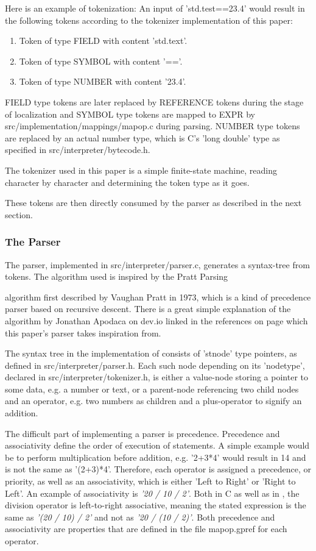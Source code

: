 \documentclass[12pt,a4paper]{report}
\newcommand{\cte}[1] {
    \cite{#1}
}
\begin{document}
Here is an example of tokenization:
An input of 'std.test==23.4' would result in the following tokens according
to the tokenizer implementation of this paper:
\begin{enumerate}
    \item Token of type FIELD with content 'std.text'.
    \item Token of type SYMBOL with content '=='.
    \item Token of type NUMBER with content '23.4'.
\end{enumerate}
FIELD type tokens are later replaced by REFERENCE tokens during the stage of localization
and SYMBOL type tokens are mapped to EXPR by src/implementation/mappings/mapop.c
during parsing. NUMBER type tokens are replaced by an actual number type, which
is C's 'long double' type as specified in src/interpreter/bytecode.h.

The tokenizer used in this paper is a simple finite-state machine, reading
character by character and determining the token type as it goes.

These tokens are then directly consumed by the parser as described in the next
section.

\subsubsection{The Parser}
The parser, implemented in src/interpreter/parser.c, generates a syntax-tree
from tokens. The algorithm used is inspired by the Pratt Parsing\cte{pratt}
algorithm first described by Vaughan Pratt in 1973, which is a kind of precedence
parser based on recursive descent. There is a great simple explanation of the algorithm
by Jonathan Apodaca on dev.io\cte{devio} linked in the references on page 
\pageref{bibliography} which this paper's parser takes inspiration from.

The syntax tree in the implementation of \name consists of 'stnode' type
pointers, as defined in src/interpreter/parser.h. Each such node depending
on its 'nodetype', declared in src/interpreter/tokenizer.h,
is either a value-node storing a pointer to some data, e.g. a number or text, or a
parent-node referencing two child nodes and an operator, e.g. two numbers as
children and a plus-operator to signify an addition.

The difficult part of implementing a parser is precedence. Precedence and
associativity define the order of execution of statements. A simple example
would be to perform multiplication before addition, e.g. '2+3*4' would
result in 14 and is not the same as '(2+3)*4'. Therefore, each operator is
assigned a precedence, or priority, as well as an associativity, which is
either 'Left to Right' or 'Right to Left'. An example of associativity is
\emph{'20 / 10 / 2'}. Both in C as well as in \name, the division operator is
left-to-right associative, meaning the stated expression is the same as
\emph{'(20 / 10) / 2'} and not as \emph{'20 / (10 / 2)'}. Both precedence 
and associativity are properties that are defined in the file mapop.gpref for
each operator.
\end{document}
